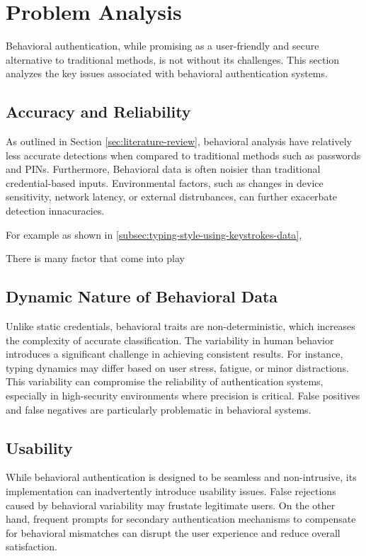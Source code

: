 \section{Problem Analysis}
\label{sec:problem-analysis}

Behavioral authentication, while promising as a user-friendly and secure alternative to traditional methods, is not without its challenges. This section analyzes the key issues associated with behavioral authentication systems.

\subsection{Accuracy and Reliability}
As outlined in Section \ref{sec:literature-review}, behavioral analysis have relatively less accurate detections when compared to traditional methods such as passwords and PINs. Furthermore, Behavioral data is often noisier than traditional credential-based inputs. Environmental factors, such as changes in device sensitivity, network latency, or external distrubances, can further exacerbate detection innacuracies.

For example as shown in \ref{subsec:typing-style-using-keystrokes-data}, 

There is many factor that come into play 

\subsection{Dynamic Nature of Behavioral Data}
Unlike static credentials, behavioral traits are non-deterministic, which increases the complexity of accurate classification. The variability in human behavior introduces a significant challenge in achieving consistent results. For instance, typing dynamics may differ based on user stress, fatigue, or minor distractions. This variability can compromise the reliability of authentication systems, especially in high-security environments where precision is critical. False positives and false negatives are particularly problematic in behavioral systems.

\subsection{Usability}
While behavioral authentication is designed to be seamless and non-intrusive, its implementation can inadvertently introduce usability issues. False rejections caused by behavioral variability may frustate legitimate users. On the other hand, frequent prompts for secondary authentication mechanisms to compensate for behavioral mismatches can disrupt the user experience and reduce overall satisfaction.
